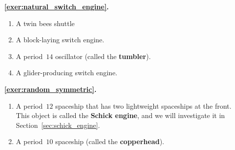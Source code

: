 \begin{multicols}{2}
	\begin{itemize}[leftmargin=0em]
		\item[\bf\color{ocre}\sffamily\ref{exer:natural_switch_engine}.] \begin{enumerate}[leftmargin=1.5em,label=\bf\color{ocre}(\alph*)]
			\item A twin bees shuttle
			
			\item A block-laying switch engine.
			
			\item A period~$14$ oscillator (called the \textbf{tumbler}).
			
			\item A glider-producing switch engine. \\[-0.3cm]
		\end{enumerate}
	

		
		
		\item[\bf\color{ocre}\sffamily\ref{exer:random_symmetric}.] \begin{enumerate}[leftmargin=1.5em,label=\bf\color{ocre}(\alph*)]
			\item A period~$12$ spaceship that has two lightweight spaceships at the front. This object is called the \textbf{Schick engine}, and we will investigate it in Section~\ref{sec:schick_engine}.
			
			\item A period~$10$ spaceship (called the \textbf{copperhead}).
			

\end{enumerate}
\end{itemize}
\end{multicols}
